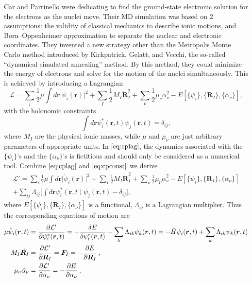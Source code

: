Car and Parrinello were dedicating to find the ground-state electronic
solution for the electrons as the nuclei move. Their MD simulation was
based on $2$ assumptions: the validity of classical mechanics to describe
ionic motions, and Born--Oppenheimer approximation to separate the
nuclear and electronic coordinates.
They invented a new strategy other than the Metropolis Monte Carlo method
introduced by Kirkpatrick, Gelatt, and Vecchi,\cite{Kirkpatrick:1983zz}
the so-called ``dynamical simulated annealing'' method.
By this method, they could minimize the energy of electrons and solve
for the motion of the nuclei simultaneously. This is achieved by introducing
a Lagrangian
\begin{equation}\label{eq:cplag}
	\mathcal{L} = \sum_{i} \frac{ 1 }{ 2 } \mu \int d\bm{r} \lvert
	\dot{\psi}_i(\bm{r}) \rvert ^ 2 +
	\sum_{I} \frac{ 1 }{ 2 } M_I \dot{ \bm{R} }_I ^ 2 +
	\sum_{\nu} \frac{ 1 }{ 2 } \mu_{\nu}  \dot{ \alpha }_\nu ^ 2 -
	E[\{ \psi_i \}, \{ \bm{R}_I \}, \{ \alpha_\nu \}],
\end{equation}
with the holonomic constraints
\begin{equation}\label{eq:cpconst}
	\int d\bm{r} \psi_i ^ \ast (\bm{r}, t) \psi_j (\bm{r}, t) = \delta_{ij},
\end{equation}
where $M_I$ are the physical ionic masses, while $\mu$ and $\mu_{\nu}$
are just arbitrary parameters of appropriate units.
In $\eqref{eq:cplag}$,
the dynamics associated with the $\{ \psi_i \}$'s and
the $\{ \alpha_\nu \}$'s is fictitious and should only be considered
as a numerical tool.
Combine
$\eqref{eq:cplag}$ and $\eqref{eq:cpconst}$ we derive
\begin{multline}
	\mathcal{L}' =
	\sum_{i} \frac{ 1 }{ 2 } \mu \int d\bm{r} \lvert
	\dot{\psi}_i(\bm{r}) \rvert ^ 2 +
	\sum_{I} \frac{ 1 }{ 2 } M_I \dot{ \bm{R} }_I ^ 2 +
	\sum_{\nu} \frac{ 1 }{ 2 } \mu_{\nu}  \dot{ \alpha }_\nu ^ 2 -
	E[\{ \psi_i \}, \{ \bm{R}_I \}, \{ \alpha_\nu \}]\\
	+ \sum_{ij} \Lambda_{ij} \bigg[
		\int d\bm{r} \psi_i ^ \ast (\bm{r}, t) \psi_j (\bm{r}, t) - \delta_{ij}
		\bigg],
\end{multline}
where $E[\{ \psi_i \}, \{ \bm{R}_I \}, \{ \alpha_\nu \}]$ is a functional,
$\Lambda_{ij}$ is a Lagrangian multiplier.
Thus the corresponding equations of motion are
\begin{align}
	\mu \ddot{\psi}_i (\bm{r}, t) & =
	\frac{ \partial \mathcal{L}' }{ \partial \psi_i^\ast (\bm{r}, t)} = -
	\frac{ \delta E}{ \delta \psi_i^\ast (\bm{r}, t)} + \sum_{k}
	\Lambda_{ik} \psi_k (\bm{r}, t) =
	- \hat{H} \psi_i(\bm{r}, t) + \sum_{k}
	\Lambda_{ik} \psi_k (\bm{r}, t)\\
	M_I \ddot{\bm{R}}_I           & =
	\frac{ \partial \mathcal{L}' }{ \partial \bm{R}_I } =
	\bm{F}_{I} =
	- \frac{ \partial E }{ \partial \bm{R}_I } \thinspace,\\
	\mu_{\nu} \ddot{\alpha}_{\nu} & =
	\frac{ \partial \mathcal{L}' }{ \partial \alpha_{\nu} } =
	- \frac{ \partial E }{ \partial \alpha_{\nu} } \thinspace,
\end{align}
